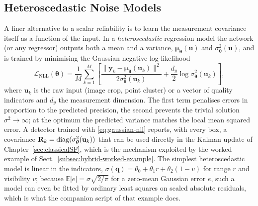 \subsection{Heteroscedastic Noise Models}
\label{subsec:heteroscedastic}
A finer alternative to a scalar reliability is to learn the measurement covariance itself as a function of the input. In a \emph{heteroscedastic} regression model the network (or any regressor) outputs both a mean and a variance, $\boldsymbol{\mu}_{\boldsymbol{\theta}}(\mathbf{u})$ and $\sigma_{\boldsymbol{\theta}}^{2}(\mathbf{u})$, and is trained by minimising the Gaussian negative log-likelihood \cite{nix1994_heteroscedastic,kendall2017_uncertainties}
\begin{equation}
\mathcal{L}_{\mathrm{NLL}}(\boldsymbol{\theta})=\frac{1}{M}\sum_{k=1}^{M}\left[\frac{\|\mathbf{y}_k-\boldsymbol{\mu}_{\boldsymbol{\theta}}(\mathbf{u}_k)\|^{2}}{2\sigma_{\boldsymbol{\theta}}^{2}(\mathbf{u}_k)}+\frac{d_y}{2}\log\sigma_{\boldsymbol{\theta}}^{2}(\mathbf{u}_k)\right],
\label{eq:gaussian-nll}
\end{equation}
where $\mathbf{u}_k$ is the raw input (image crop, point cluster) or a vector of quality indicators and $d_y$ the measurement dimension. The first term penalises errors in proportion to the predicted precision, the second prevents the trivial solution $\sigma^{2}\to\infty$; at the optimum the predicted variance matches the local mean squared error. A detector trained with \eqref{eq:gaussian-nll} reports, with every box, a covariance $\mathbf{R}_k=\operatorname{diag}(\sigma_{\boldsymbol{\theta}}^{2}(\mathbf{u}_k))$ that can be used directly in the Kalman update of Chapter~\ref{sec:classicalSF}, which is the mechanism exploited by the worked example of Sect.~\ref{subsec:hybrid-worked-example}. The simplest heteroscedastic model is linear in the indicators, $\sigma(\mathbf{q})=\theta_0+\theta_1 r+\theta_2(1-v)$ for range $r$ and visibility $v$; because $\mathbb{E}|e|=\sigma\sqrt{2/\pi}$ for a zero-mean Gaussian error $e$, such a model can even be fitted by ordinary least squares on scaled absolute residuals, which is what the companion script of that example does.

